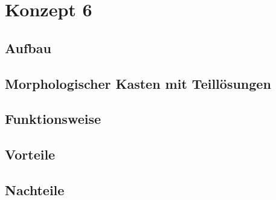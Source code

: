 \section{Konzept 6}

\subsection{Aufbau}

\subsection{Morphologischer Kasten mit Teill\"{o}sungen}

\subsection{Funktionsweise}

\subsection{Vorteile}

\subsection{Nachteile}
